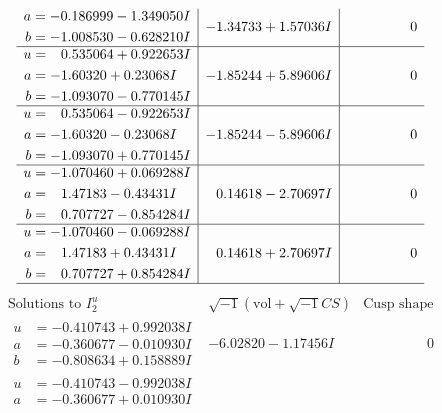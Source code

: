 \documentclass[1p]{elsarticle_modified}
\theoremstyle{definition}
\newcommand{\I}{\sqrt{-1}}
\begin{document}
$$\begin{array}{c|c|c}
\begin{aligned}
a &= -0.186999 - 1.349050 I \\
b &= -1.008530 - 0.628210 I\end{aligned}
 & -1.34733 + 1.57036 I & \phantom{-0.000000 } 0 \\ \hline\begin{aligned}
u &= \phantom{-}0.535064 + 0.922653 I \\
a &= -1.60320 + 0.23068 I \\
b &= -1.093070 - 0.770145 I\end{aligned}
 & -1.85244 + 5.89606 I & \phantom{-0.000000 } 0 \\ \hline\begin{aligned}
u &= \phantom{-}0.535064 - 0.922653 I \\
a &= -1.60320 - 0.23068 I \\
b &= -1.093070 + 0.770145 I\end{aligned}
 & -1.85244 - 5.89606 I & \phantom{-0.000000 } 0 \\ \hline\begin{aligned}
u &= -1.070460 + 0.069288 I \\
a &= \phantom{-}1.47183 - 0.43431 I \\
b &= \phantom{-}0.707727 - 0.854284 I\end{aligned}
 & \phantom{-}0.14618 - 2.70697 I & \phantom{-0.000000 } 0 \\ \hline\begin{aligned}
u &= -1.070460 - 0.069288 I \\
a &= \phantom{-}1.47183 + 0.43431 I \\
b &= \phantom{-}0.707727 + 0.854284 I\end{aligned}
 & \phantom{-}0.14618 + 2.70697 I & \phantom{-0.000000 } 0\\
 \hline 
 \end{array}$$\newpage$$\begin{array}{c|c|c}  
\text{Solutions to }I^u_{2}& \I (\text{vol} + \sqrt{-1}CS) & \text{Cusp shape}\\
 \hline 
\begin{aligned}
u &= -0.410743 + 0.992038 I \\
a &= -0.360677 - 0.010930 I \\
b &= -0.808634 + 0.158889 I\end{aligned}
 & -6.02820 - 1.17456 I & \phantom{-0.000000 } 0 \\ \hline\begin{aligned}
u &= -0.410743 - 0.992038 I \\
a &= -0.360677 + 0.010930 I \\

\end{aligned}
\end{array}$$
\end{document}
